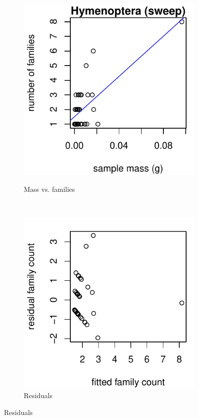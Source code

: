 \documentclass[10pt,letterpaper,twocolumn]{article}
\begin{document}
\begin{figure}[h]
	\centering
	\begin{subfigure}[b]{0.15\textwidth}
		\caption{Mass vs. families}
		\includegraphics[width=\textwidth]{plots/mass-vs-count/scatter/2015_sweep_Hymenoptera_mass-vs-count.pdf}
		\label{fig:sweep_hymenoptera_scatter}
	\end{subfigure}
	~
	\begin{subfigure}[b]{0.15\textwidth}
		\caption{Residuals}
		\includegraphics[width=\textwidth]{plots/mass-vs-count/residual/2015_sweep_Hymenoptera_residual.pdf}

\end{subfigure}
\end{figure}
\end{document}
